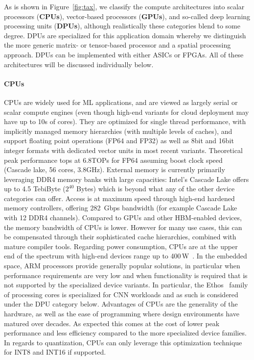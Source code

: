 As is shown in Figure~\ref{fig:tax}, we classify the compute architectures into scalar processors (\textbf{CPUs}), vector-based processors (\textbf{GPUs}), and so-called deep learning processing units (\textbf{DPUs}), although realistically these categories blend to some degree. 
DPUs are specialized for this application domain whereby we distinguish the more generic matrix- or tensor-based processor and a spatial processing approach. DPUs can be implemented with either ASICs or FPGAs. All of these architectures will be discussed individually below.

\paragraph*{CPUs} CPUs are widely used for ML applications, and are viewed as largely serial or scalar compute engines (even though high-end variants for cloud deployment may have up to 10s of cores). They are optimized for single thread performance, with implicitly managed memory hierarchies (with multiple levels of caches), and support floating point operations (FP64 and FP32) as well as 8bit and 16bit integer formats with dedicated vector units in most recent variants. Theoretical peak performance tops at 6.8TOPs for FP64 assuming boost clock speed (Cascade lake, 56 cores, 3.8GHz). External memory is currently primarily leveraging DDR4 memory banks with large capacities: Intel's Cascade Lake offers up to 4.5 TebiByte ($2^{40}$ Bytes) which is beyond what any of the other device categories can offer. Access is at maximum speed through high-end hardened memory controllers, offering 282~Gbps bandwidth (for example Cascade Lake with 12 DDR4 channels). 
Compared to GPUs and other HBM-enabled devices, the memory bandwidth of CPUs is lower. However for many use cases, this can be compensated through their sophisticated cache hierarchies, combined with mature compiler tools.
Regarding power consumption, CPUs are at the upper end of the spectrum with high-end devices range up to 400\,W~\cite{cascadelake}.
In the embedded space, ARM processors provide generally popular solutions, in particular when performance requirements are very low and when functionality is required that is not supported by the specialized device variants. In particular, the 
Ethos~\cite{skillman2020technical} family of processing cores is specialized for CNN workloads and as such is considered under the DPU category below.
Advantages of CPUs are the generality of the hardware, as well as the ease of programming where design environments have matured over decades. 
As expected this comes at the cost of lower peak performance and less efficiency compared to the more specialized device families.
In regards to quantization, CPUs can only leverage this optimization technique for INT8 and INT16 if supported.

